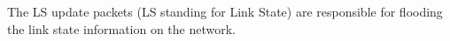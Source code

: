 The LS update packets (LS standing for Link State) are responsible for flooding the link state information on the network.